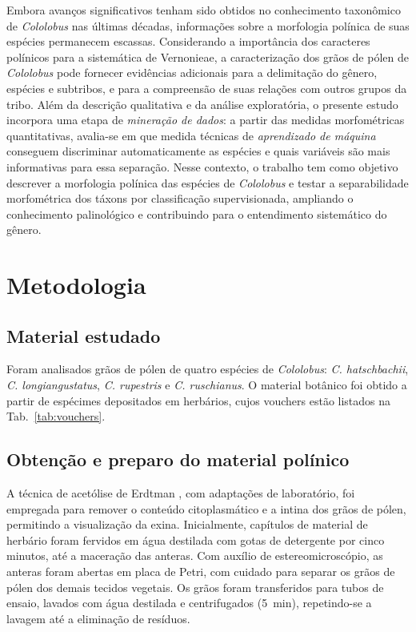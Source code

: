 \documentclass[pdflatex,sn-mathphys-num]{sn-jnl}
\begin{document}
Embora avanços significativos tenham sido obtidos no conhecimento taxonômico de \textit{Cololobus} nas últimas décadas, informações sobre a morfologia polínica de suas espécies permanecem escassas. Considerando a importância dos caracteres polínicos para a sistemática de Vernonieae, a caracterização dos grãos de pólen de \textit{Cololobus} pode fornecer evidências adicionais para a delimitação do gênero, espécies e subtribos, e para a compreensão de suas relações com outros grupos da tribo. Além da descrição qualitativa e da análise exploratória, o presente estudo incorpora uma etapa de \textit{mineração de dados}: a partir das medidas morfométricas quantitativas, avalia-se em que medida técnicas de \textit{aprendizado de máquina} conseguem discriminar automaticamente as espécies e quais variáveis são mais informativas para essa separação. Nesse contexto, o trabalho tem como objetivo descrever a morfologia polínica das espécies de \textit{Cololobus} e testar a separabilidade morfométrica dos táxons por classificação supervisionada, ampliando o conhecimento palinológico e contribuindo para o entendimento sistemático do gênero.

\section{Metodologia}\label{sec:metodologia}

\subsection{Material estudado}\label{subsec:material}

Foram analisados grãos de pólen de quatro espécies de \textit{Cololobus}: \textit{C. hatschbachii}, \textit{C. longiangustatus}, \textit{C. rupestris} e \textit{C. ruschianus}. O material botânico foi obtido a partir de espécimes depositados em herbários, cujos vouchers estão listados na Tab.~\ref{tab:vouchers}.

\subsection{Obtenção e preparo do material polínico}\label{subsec:preparo}

A técnica de acetólise de Erdtman \cite{erdtman1960}, com adaptações de laboratório, foi empregada para remover o conteúdo citoplasmático e a intina dos grãos de pólen, permitindo a visualização da exina. Inicialmente, capítulos de material de herbário foram fervidos em água destilada com gotas de detergente por cinco minutos, até a maceração das anteras. Com auxílio de estereomicroscópio, as anteras foram abertas em placa de Petri, com cuidado para separar os grãos de pólen dos demais tecidos vegetais. Os grãos foram transferidos para tubos de ensaio, lavados com água destilada e centrifugados (5~min), repetindo-se a lavagem até a eliminação de resíduos.
\end{document}
